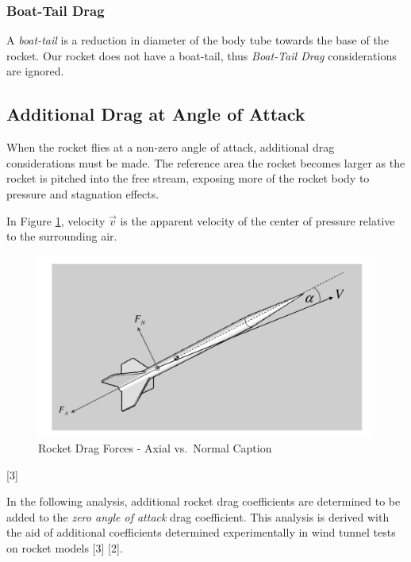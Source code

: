 \documentclass[]{article}
\begin{document}
\subsubsection{Boat-Tail Drag}\label{boat-tail-drag}

A \emph{boat-tail} is a reduction in diameter of the body tube towards
the base of the rocket. Our rocket does not have a boat-tail, thus
\emph{Boat-Tail Drag} considerations are ignored.

\clearpage 

\subsection{Additional Drag at Angle of
Attack}\label{additional-drag-at-angle-of-attack}

When the rocket flies at a non-zero angle of attack, additional drag
considerations must be made. The reference area the rocket becomes
larger as the rocket is pitched into the free stream, exposing more of
the rocket body to pressure and stagnation effects.

In Figure \ref{rocket_drag_aoa_label}, velocity \(\vec{v}\) is the
apparent velocity of the center of pressure relative to the surrounding
air.

\begin{figure}[htbp]
\centering
\includegraphics{images/rocket_drag_forces.png}
\caption{Rocket Drag Forces - Axial vs.~Normal Caption
\label{rocket_drag_aoa_label}}
\end{figure}

{[}3{]}

In the following analysis, additional rocket drag coefficients are
determined to be added to the \emph{zero angle of attack} drag
coefficient. This analysis is derived with the aid of additional
coefficients determined experimentally in wind tunnel tests on rocket
models {[}3{]} {[}2{]}.
\end{document}
